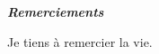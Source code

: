 
\vspace*{\fill}

\begin{flushright}

{\LARGE\par{\textbf{\emph{Remerciements}}}}

Je tiens à remercier la vie.

\end{flushright}

\vspace{\fill}
